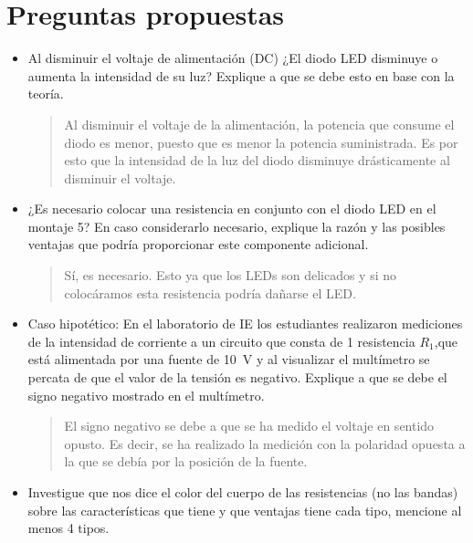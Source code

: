 \documentclass{article}
\begin{document}
    \section{Preguntas propuestas}
    \begin{itemize}
        \item Al disminuir el voltaje de alimentación (DC) ¿El diodo LED disminuye o aumenta la intensidad de su luz? Explique a que se debe esto en base con la teoría.
        \begin{quote}
            Al disminuir el voltaje de la alimentación, la potencia que consume el diodo es menor, puesto que es menor la potencia suministrada. Es por esto que la intensidad de la luz del diodo disminuye drásticamente al disminuir el voltaje.
        \end{quote}

        \item ¿Es necesario colocar una resistencia en conjunto con el diodo LED en el montaje 5? En caso considerarlo necesario, explique la razón y las posibles ventajas que podría proporcionar este componente adicional.
        
        \begin{quote}
            Sí, es necesario. Esto ya que los LEDs son delicados y si no colocáramos esta resistencia podría dañarse el LED.\@
        \end{quote}

        \item Caso hipotético: En el laboratorio de IE los estudiantes realizaron mediciones de la intensidad de corriente a un circuito que consta de 1 resistencia $R_1$,que está alimentada por una fuente de \SI{10}{\volt} y al visualizar el multímetro se percata de que el valor de la tensión es negativo. Explique a que se debe el signo negativo mostrado en el multímetro.
        
        \begin{quote}
            El signo negativo se debe a que se ha medido el voltaje en sentido opusto. Es decir, se ha realizado la medición con la polaridad opuesta a la que se debía por la posición de la fuente.
        \end{quote}

        \item Investigue que nos dice el color del cuerpo de las resistencias (no las bandas) sobre las características que tiene y que ventajas tiene cada tipo, mencione al menos 4 tipos.
        

\end{itemize}
\end{document}
